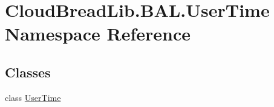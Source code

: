 \hypertarget{a00430}{}\section{Cloud\+Bread\+Lib.\+B\+A\+L.\+User\+Time Namespace Reference}
\label{a00430}
\subsection*{Classes}
\begin{DoxyCompactItemize}
\item 
class \hyperlink{a00189}{User\+Time}
\end{DoxyCompactItemize}
